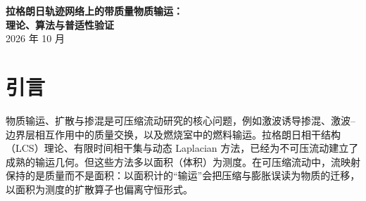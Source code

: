 \documentclass[10.5pt,a4paper]{article}
\begin{document}
\begin{center}
{\LARGE\bfseries 拉格朗日轨迹网络上的带质量物质输运：\\[4pt] 理论、算法与普适性验证}\\[10pt]
2026 年 10 月
\end{center}

\begin{abstract}
\noindent 我们在拉格朗日轨迹网络上建立一套只用示踪点位置的物质输运框架，涵盖质量输运、扩散与掺混，对可压缩与不可压缩流动给出统一的定量描述。

\textbf{理论。}核心是把测度从面积换成质量 $\mu=\rho\,dA$：每个示踪点携带一个守恒的质量，密度由物质面积比给出，跨激波时以推迟重锚保持望远相消。在此基础上推导出四部分结果：
\begin{itemize}
\item 跨截面与区域间输运的估计量，以及按质量加权的转移算子；
\item 网络上的拉格朗日对流—扩散方程：其质量矩阵在拉格朗日形式下与时间无关，并证明了按质量加权的标量守恒与方差单调衰减；
\item 界面梯度增长的分解 $d\ln|\nabla c|/dt=\sigma_t-\theta$，它把掺混分成切向拉伸与压缩两部分；
\item 不可压缩流动是所有结论在 $\rho$ 为常数时的特例。
\end{itemize}

\textbf{验证。}用同一套代码与同一组参数，在六个算例上逐项检验：双环流、Lamb–Oseen 涡对、Sod 激波管、柱面爆炸波、激波–重气泡与激波–等熵涡。参照包括精确轨迹、高分辨率欧拉解、质量坐标下的一维精确求解与 DNS。主要结果：
\begin{itemize}
\item 跨截面质量通量与区域间交换的误差为 0.2\%–2\%，且随分辨率收敛；
\item 扩散解与参照之差为 0.2\%–6\%；在可压缩算例中，用体积代替质量作测度会使误差增大一个数量级；
\item 掺混归因中的压缩项与解析值一致到 $10^{-3}$，局部拉伸与参照之差在 4\% 以内；
\item 结果对 0.1 倍间距的位置噪声不敏感；对追踪方式，通量与扩散的差异约 1\%。
\end{itemize}

\textbf{局限。}我们同样报告了方法的失效边界：界面切向强剪切下有限点对的拉伸偏差，以及离线追踪对密度重建的影响。
\end{abstract}

\section{引言}
物质输运、扩散与掺混是可压缩流动研究的核心问题，例如激波诱导掺混、激波–边界层相互作用中的质量交换，以及燃烧室中的燃料输运。拉格朗日相干结构（LCS）理论、有限时间相干集与动态 Laplacian 方法，已经为不可压流动建立了成熟的输运几何。但这些方法多以面积（体积）为测度。在可压缩流动中，流映射保持的是质量而不是面积：以面积计的“输运”会把压缩与膨胀误读为物质的迁移，以面积为测度的扩散算子也偏离守恒形式。
\end{document}
